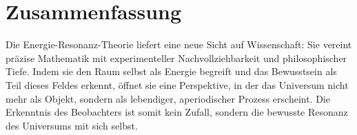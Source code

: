 \section{Zusammenfassung}
\label{sec:zusammenfassung9}
Die Energie-Resonanz-Theorie liefert eine neue Sicht auf Wissenschaft: 
Sie vereint präzise Mathematik mit experimenteller Nachvollziehbarkeit und philosophischer Tiefe. 
Indem sie den Raum selbst als Energie begreift und das Bewusstsein als Teil dieses Feldes erkennt, 
öffnet sie eine Perspektive, in der das Universum nicht mehr als Objekt, 
sondern als lebendiger, aperiodischer Prozess erscheint. 
Die Erkenntnis des Beobachters ist somit kein Zufall, 
sondern die bewusste Resonanz des Universums mit sich selbst.
